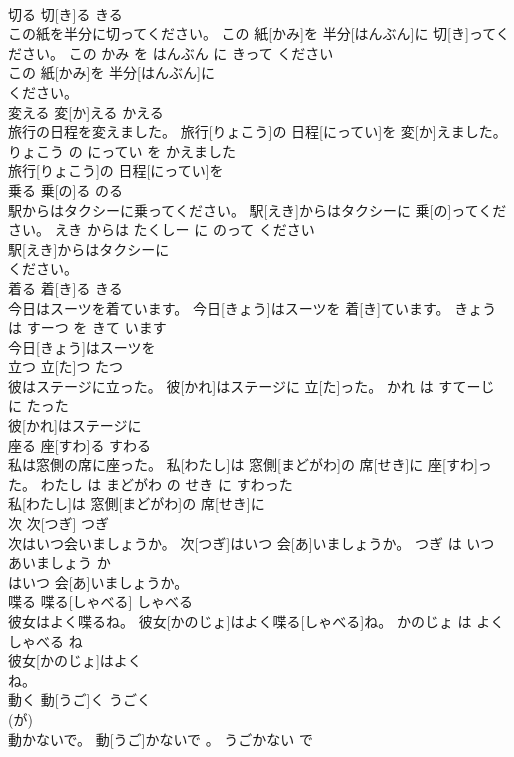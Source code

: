 \documentclass[8pt]{extreport}
\begin{document}
\begin{CJK}{UTF8}{min}
\\	切る	切[き]る	きる	
\\	この紙を半分に切ってください。	この 紙[かみ]を 半分[はんぶん]に 切[き]ってください。	この かみ を はんぶん に きって ください	
\\	この 紙[かみ]を 半分[はんぶん]に
\\	ください。		
\\	変える	変[か]える	かえる	
\\	旅行の日程を変えました。	旅行[りょこう]の 日程[にってい]を 変[か]えました。	りょこう の にってい を かえました	
\\	旅行[りょこう]の 日程[にってい]を
\\	乗る	乗[の]る	のる	
\\	駅からはタクシーに乗ってください。	駅[えき]からはタクシーに 乗[の]ってください。	えき からは たくしー に のって ください	
\\	駅[えき]からはタクシーに
\\	ください。		
\\	着る	着[き]る	きる	
\\	今日はスーツを着ています。	今日[きょう]はスーツを 着[き]ています。	きょう は すーつ を きて います	
\\	今日[きょう]はスーツを
\\	立つ	立[た]つ	たつ	
\\	彼はステージに立った。	彼[かれ]はステージに 立[た]った。	かれ は すてーじ に たった	
\\	彼[かれ]はステージに
\\	座る	座[すわ]る	すわる	
\\	私は窓側の席に座った。	私[わたし]は 窓側[まどがわ]の 席[せき]に 座[すわ]った。	わたし は まどがわ の せき に すわった	
\\	私[わたし]は 窓側[まどがわ]の 席[せき]に
\\	次	次[つぎ]	つぎ	
\\	次はいつ会いましょうか。	次[つぎ]はいつ 会[あ]いましょうか。	つぎ は いつ あいましょう か	
\\	はいつ 会[あ]いましょうか。		
\\	喋る	喋る[しゃべる]	しゃべる	
\\	彼女はよく喋るね。	彼女[かのじょ]はよく喋る[しゃべる]ね。	かのじょ は よく しゃべる ね	
\\	彼女[かのじょ]はよく
\\	ね。		
\\	動く	動[うご]く	うごく	
\\	(が)		
\\	動かないで。	動[うご]かないで 。	うごかない で	

\end{CJK}
\end{document}
